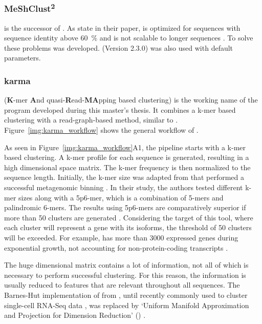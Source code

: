 \documentclass[12pt,a4paper,english]{article}
\begin{document}
\subsubsection*{MeShClust\textsuperscript{2}}
	\mclusttwo \citep{meshclust2:18} is the successor of \mclust. As \citeauthor{meshclust:18} state in their paper, \mclust is optimized for sequences with sequence identity above 60~\% and is not scalable to longer sequences \citep{meshclust:18}. To solve these problems \mclusttwo was developed. \mclusttwo (Version 2.3.0) was also used with default parameters.

\subsubsection*{karma}
	\label{sssec:karma}
	\karma (\textbf{K}-mer \textbf{A}nd quasi-\textbf{R}ead-\textbf{MA}pping based clustering) is the working name of the program developed during this master's thesis. It combines a k-mer based clustering with a read-graph-based method, similar to \grouper. Figure~\ref{img:karma_workflow} shows the general workflow of \karma.
	
	As seen in Figure~\ref{img:karma_workflow}A1, the pipeline starts with a k-mer based clustering. A k-mer profile for each sequence is generated, resulting in a high dimensional space matrix. The k-mer frequency is then normalized to the sequence length. Initially, the k-mer size was adapted from \citeauthor{binning:16} that performed a successful metagenomic binning \citep{binning:16}. In their study, the authors tested different k-mer sizes along with a 5p6-mer, which is a combination of 5-mers and palindromic 6-mers. 
	The results using 5p6-mers are comparatively superior if more than 50 clusters are generated \citep{binning:16}.
	Considering the target of this tool, where each cluster will represent a gene with its isoforms, the threshold of 50 clusters will be exceeded. For example, \ecoli has more than 3000 expressed genes during exponential growth, not accounting for non-protein-coding transcripts \citep{ecoli:99}.
	
	The huge dimensional matrix contains a lot of information, not all of which is necessary to perform successful clustering. For this reason, the information is usually reduced to features that are relevant throughout all sequences. The Barnes-Hut implementation of \tsne from \citeauthor{binning:16} \citep{binning:16}, until recently commonly used to cluster single-cell RNA-Seq data \citep{tSNE_common:19}, was replaced by `Uniform Manifold Approximation and Projection for Dimension Reduction' (\umap) \citep{umap:18}.
	
\end{document}
